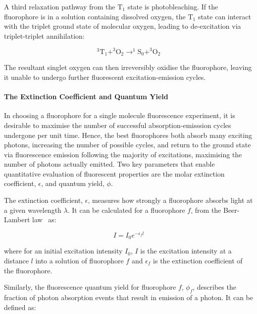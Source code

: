 A third relaxation pathway from the $\text{T}_1$ state is photobleaching. If the fluorophore is in a solution containing dissolved oxygen, the $\text{T}_1$ state can interact with the triplet ground state of molecular oxygen, leading to de-excitation via triplet-triplet annihilation:

\begin{equation}
^3\text{T}_1 + ^3\text{O}_2 \longrightarrow ^1\text{S}_0 + ^3\text{O}_2
\label{eq:blinking1}
\end{equation} 

The resultant singlet oxygen can then irreversibly oxidise the fluorophore, leaving it unable to undergo further fluorescent excitation-emission cycles.   


\paragraph{The Extinction Coefficient and Quantum Yield}
\label{par:qy}
In choosing a fluorophore for a single molecule fluorescence experiment, it is desirable to maximise the number of successful absorption-emisssion cycles undergone per unit time. Hence, the best fluorophores both absorb many exciting photons, increasing the number of possible cycles, and return to the ground state via fluorescence emission following the majority of excitations, maximising the number of photons actually emitted. Two key parameters that enable quantitative evaluation of fluorescent properties are the molar extinction coefficient, $\epsilon$, and quantum yield, $\phi$. 

The extinction coefficient, $\epsilon$, measures how strongly a fluorophore absorbs light at a given wavelength $\lambda$. It can be calculated for a fluorophore $f$, from the Beer-Lambert law~\cite{goldbook2006} as:

\begin{equation}
I = I_0 e^{-\epsilon_f l}
\label{eq:ext_coeff}
\end{equation}

where for an initial excitation intensity $I_0$, $I$ is the excitation intensity at a distance $l$ into a solution of fluorophore $f$ and $\epsilon_f$ is the extinction coefficient of the fluorophore.

Similarly, the fluorescence quantum yield for fluorophore $f$, $\phi_f$, describes the fraction of photon absorption events that result in emission of a photon. It can be defined as: 

